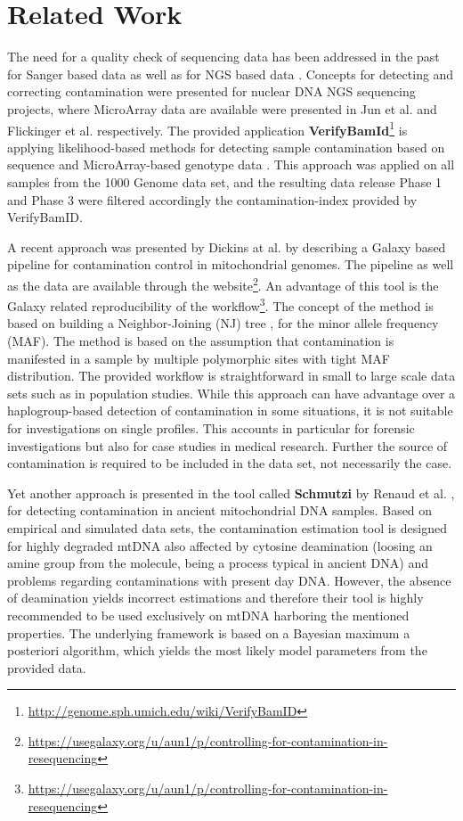 \section{Related Work}\label{cont:relatedwork}
The need for a quality check of sequencing data has been addressed in the past for Sanger based data \cite{Walker2004, Montesino2007, Bandelt2009, Yao2007} as well as for NGS based data \cite{Holland2011}. 
Concepts for detecting and correcting contamination were presented for nuclear DNA NGS sequencing projects, where MicroArray data are available were presented in Jun et al. \cite{Jun2012} and Flickinger et al. \cite{Flickinger2015} respectively. The provided application \textbf{VerifyBamId}\footnote{\url{http://genome.sph.umich.edu/wiki/VerifyBamID}} is applying likelihood-based methods for detecting sample contamination based on sequence and MicroArray-based genotype data \cite{Jun2012}. This approach was applied on all samples from the 1000 Genome data set, and the resulting data release Phase 1 and Phase 3 were filtered accordingly the contamination-index provided by VerifyBamID. 

A recent approach was presented by Dickins at al. \cite{Dickins2014} by describing a Galaxy \cite{Goecks2010,Afgan2016} based pipeline for contamination control in mitochondrial genomes. The pipeline as well as the data are available through the website\footnote{\url{https://usegalaxy.org/u/aun1/p/controlling-for-contamination-in-resequencing}}. An advantage of this tool is the Galaxy related reproducibility of the workflow\footnote{\url{https://usegalaxy.org/u/aun1/p/controlling-for-contamination-in-resequencing}}. The concept of the method is based on building a Neighbor-Joining (NJ) tree \cite{Saitou1987}, for the minor allele frequency (MAF). The method is based on the assumption that contamination is manifested in a sample by multiple polymorphic sites with tight MAF distribution. The provided workflow is straightforward in small to large scale data sets such as in population studies. While this approach can have advantage over a haplogroup-based detection of contamination in some situations, it is not suitable for investigations on single profiles.  This accounts in particular for forensic investigations but also for case studies in medical research. Further the source of contamination is required to be included in the data set, not necessarily the case.

Yet another approach is presented in the tool called \textbf{Schmutzi} by Renaud et al. \cite{Renaud2015}, for detecting contamination in ancient mitochondrial DNA samples. Based on empirical and simulated data sets, the contamination estimation tool is designed for highly degraded mtDNA also affected by cytosine deamination (loosing an amine group from the molecule, being  a process typical in ancient DNA) and problems regarding contaminations with present day DNA.  However, the absence of deamination yields incorrect estimations and therefore their tool is highly recommended to be used exclusively on mtDNA harboring the mentioned properties. The underlying framework is based on a Bayesian maximum a posteriori algorithm, which yields the most likely model parameters from the provided data. 

